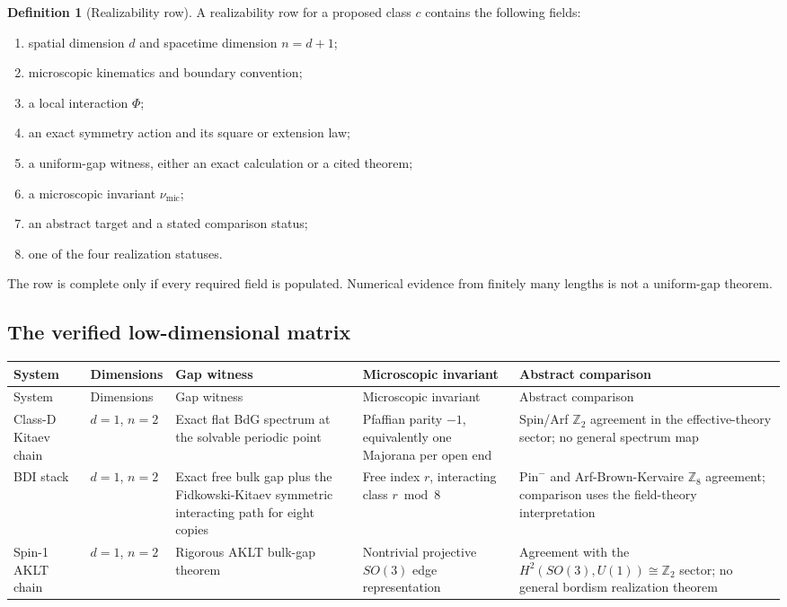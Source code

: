 \documentclass[12pt]{article}
\theoremstyle{definition}
\newtheorem{definition}[theorem]{Definition}
\theoremstyle{remark}
\begin{document}
\begin{definition}[Realizability row]
A realizability row for a proposed class $c$ contains the following fields:

\begin{enumerate}[leftmargin=2.2em]
\item spatial dimension $d$ and spacetime dimension $n=d+1$;
\item microscopic kinematics and boundary convention;
\item a local interaction $\Phi$;
\item an exact symmetry action and its square or extension law;
\item a uniform-gap witness, either an exact calculation or a cited theorem;
\item a microscopic invariant $\nu_{\mathrm{mic}}$;
\item an abstract target and a stated comparison status;
\item one of the four realization statuses.
\end{enumerate}
\end{definition}

The row is complete only if every required field is populated.  Numerical
evidence from finitely many lengths is not a uniform-gap theorem.

\subsection{The verified low-dimensional matrix}

\renewcommand{\arraystretch}{1.28}
\begin{longtable}{>{\raggedright\arraybackslash}p{}
                  >{\raggedright\arraybackslash}p{}
                  >{\raggedright\arraybackslash}p{}
                  >{\raggedright\arraybackslash}p{}
                  >{\raggedright\arraybackslash}p{}}
\toprule
System & Dimensions & Gap witness & Microscopic invariant & Abstract comparison \\
\midrule
\endfirsthead
\toprule
System & Dimensions & Gap witness & Microscopic invariant & Abstract comparison \\
\midrule
\endhead
Class-D Kitaev chain
& $d=1$, $n=2$
& Exact flat BdG spectrum at the solvable periodic point
& Pfaffian parity $-1$, equivalently one Majorana per open end
& Spin/Arf $\mathbb Z_2$ agreement in the effective-theory sector; no general spectrum map \\

BDI stack
& $d=1$, $n=2$
& Exact free bulk gap plus the Fidkowski-Kitaev symmetric interacting path for eight copies
& Free index $r$, interacting class $r\bmod 8$
& $\mathrm{Pin}^-$ and Arf-Brown-Kervaire $\mathbb Z_8$ agreement; comparison uses the field-theory interpretation \\

Spin-1 AKLT chain
& $d=1$, $n=2$
& Rigorous AKLT bulk-gap theorem
& Nontrivial projective $SO(3)$ edge representation
& Agreement with the $H^2(SO(3),U(1))\cong\mathbb Z_2$ sector; no general bordism realization theorem \\
\bottomrule
\end{longtable}
\end{document}
